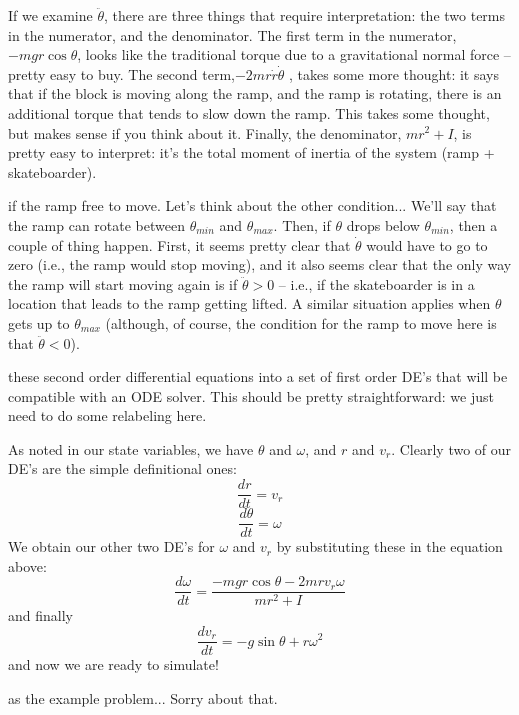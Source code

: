 If we examine $\ddot{\theta}$, there are three things that require interpretation: the two terms in the numerator, and the denominator.  The first term in the numerator, $-mgr\cos\theta$,  looks like the traditional torque due to a gravitational normal force -- pretty easy to buy.  The second term,$- 2mr\dot{r}\dot{\theta}$ , takes some more thought: it says that if the block is moving along the ramp, and the ramp is rotating, there is an additional torque that tends to slow down the ramp.  This takes some thought, but makes sense if you think about it.  Finally, the denominator, $mr^2 + I$, is pretty easy to interpret: it's the total moment of inertia of the system (ramp + skateboarder).

 if the ramp free to move.  Let's think about the other condition...  We'll say that the ramp can rotate between $\theta_{min}$ and $\theta_{max}$.   Then, if $\theta$ drops below $\theta_{min}$, then a couple of thing happen.  First, it seems pretty clear that $\dot{\theta}$ would have to go to zero (i.e., the ramp would stop moving), and it also seems clear that the only way the ramp will start moving again is if $\ddot{\theta}>0$ -- i.e., if the skateboarder is in a location that leads to the ramp getting lifted.  A similar situation applies when $\theta$ gets up to $\theta_{max}$ (although, of course, the condition for the ramp to move here is that $\ddot{\theta}<0$).


 these second order differential equations into a set of first order DE's that will be compatible with an ODE solver. This should be pretty straightforward: we just need to do some relabeling here.

As noted in our state variables, we have $\theta$ and $\omega$, and $r$ and $v_r$.  Clearly two of our DE's are the simple definitional ones:
$$\frac{dr}{dt} = v_r$$
$$\frac{d\theta}{dt} = \omega$$
We obtain our other two DE's for $\omega$ and $v_r$ by substituting these in the equation above:
$$\frac{d\omega}{dt} = \frac{-mgr\cos\theta - 2mr v_r \omega}{mr^2 + I}$$
and finally 
$$\frac{dv_r}{dt} = -g \sin \theta + r\omega^2$$
and now we are ready to simulate!  

 as the example problem... Sorry about that.
